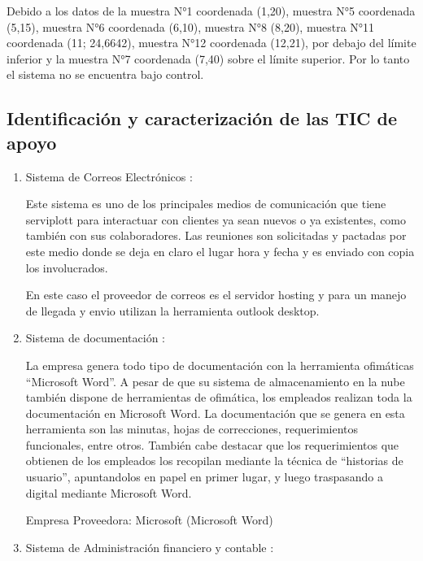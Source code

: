 	
	Debido a los datos de la muestra N°1 coordenada (1,20), muestra N°5 coordenada
(5,15), muestra N°6 coordenada (6,10), muestra N°8 (8,20), muestra N°11 coordenada
(11; 24,6642), muestra N°12 coordenada (12,21), por debajo del límite inferior y la
muestra N°7 coordenada (7,40) sobre el límite superior.
Por lo tanto el sistema no se encuentra bajo control.
	


	\subsection{Identificación y caracterización de las TIC de apoyo}
	
	\begin{enumerate}[1)]
	\item Sistema de Correos Electrónicos :
	
	
	 Este sistema es uno de los principales medios de comunicación que tiene serviplott para interactuar con clientes ya sean nuevos o ya existentes, como también con sus colaboradores.  Las reuniones son solicitadas y pactadas por este medio donde se deja en claro el lugar hora y fecha y es enviado con copia los involucrados.   
	

En este caso el proveedor de correos es el servidor hosting y para un manejo de llegada y envio utilizan la herramienta outlook desktop.  

	\item Sistema de documentación :
	
	
	 La empresa genera todo tipo de documentación con la herramienta ofimáticas “Microsoft Word”. A pesar de que su sistema de almacenamiento en la nube también dispone de herramientas de ofimática, los empleados realizan toda la documentación en Microsoft Word.
La documentación que se genera en esta herramienta son las minutas, hojas de correcciones, requerimientos funcionales, entre otros. También cabe destacar que los requerimientos que obtienen de los empleados los recopilan mediante la técnica de “historias de usuario”, apuntandolos en papel en primer lugar, y luego traspasando a digital mediante Microsoft Word. 



Empresa Proveedora: Microsoft (Microsoft Word)


	\item Sistema de Administración  financiero y contable :


\end{enumerate}
